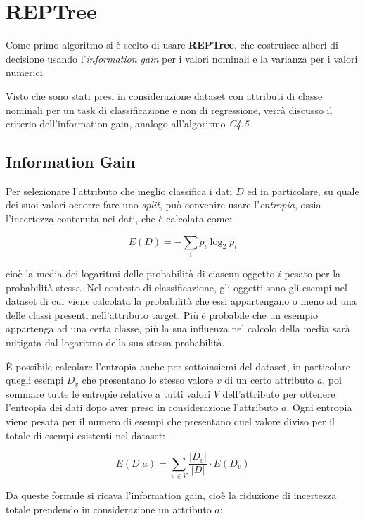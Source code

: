 \chapter{REPTree}
\label{ch:reptree}

Come primo algoritmo si è scelto di usare \textbf{REPTree}, che costruisce alberi di decisione usando l'\textit{information gain} per i valori nominali e la varianza per i valori numerici\cite{2Witten:2011:DMP:REPTree}.

Visto che sono stati presi in considerazione dataset con attributi di classe nominali per un task di classificazione e non di regressione, verrà discusso il criterio dell'information gain, analogo all'algoritmo \textit{C4.5}\cite{Quinlan:1993:CPM:152181}.

\section{Information Gain}
Per selezionare l'attributo che meglio classifica i dati $D$ ed in particolare, su quale dei suoi valori occorre fare uno \textit{split}, può convenire usare l'\emph{entropia}\cite{Shannon:1948}, ossia l'incertezza contenuta nei dati, che è calcolata come:

$$ E(D) = - \sum_{i} p_i \log_2 p_i $$

cioè la media dei logaritmi delle probabilità di ciascun oggetto $i$ pesato per la probabilità stessa. Nel contesto di classificazione, gli oggetti sono gli esempi nel dataset di cui viene calcolata la probabilità che essi appartengano o meno ad una delle classi presenti nell'attributo target. Più è probabile che un esempio appartenga ad una certa classe, più la sua influenza nel calcolo della media sarà mitigata dal logaritmo della sua stessa probabilità.

È possibile calcolare l'entropia anche per sottoinsiemi del dataset, in particolare quegli esempi $D_v$ che presentano lo stesso valore $v$ di un certo attributo $a$, poi sommare tutte le entropie relative a tutti valori $V$ dell'attributo per ottenere l'entropia dei dati dopo aver preso in considerazione l'attributo $a$.
Ogni entropia viene pesata per il numero di esempi che presentano quel valore diviso per il totale di esempi esistenti nel dataset:

$$ E(D|a) = \sum_{v \in V} \frac{|D_v|}{|D|} \cdot E(D_v) $$

Da queste formule si ricava l'information gain, cioè la riduzione di incertezza totale prendendo in considerazione un attributo $a$:

